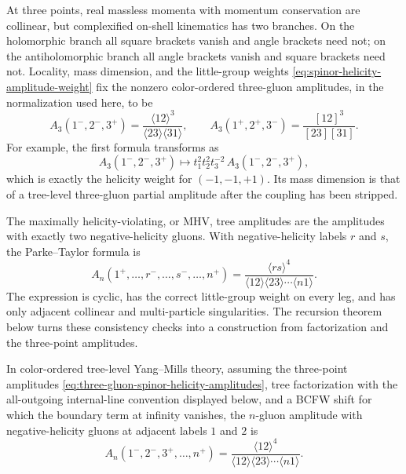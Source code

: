 At three points, real massless momenta with momentum conservation are
collinear, but complexified on-shell kinematics has two branches.  On the
holomorphic branch all square brackets vanish and angle brackets need not; on
the antiholomorphic branch all angle brackets vanish and square brackets need
not.  Locality, mass dimension, and the little-group weights
\eqref{eq:spinor-helicity-amplitude-weight} fix the nonzero color-ordered
three-gluon amplitudes, in the normalization used here, to be
\begin{equation}
  A_3(1^-,2^-,3^+)
  =
  \frac{\langle12\rangle^3}
       {\langle23\rangle\langle31\rangle},
  \qquad
  A_3(1^+,2^+,3^-)
  =
  \frac{[12]^3}{[23][31]}.
  \label{eq:three-gluon-spinor-helicity-amplitudes}
\end{equation}
For example, the first formula transforms as
\[
  A_3(1^-,2^-,3^+)
  \longmapsto
  t_1^2t_2^2t_3^{-2}\,
  A_3(1^-,2^-,3^+),
\]
which is exactly the helicity weight for \((-1,-1,+1)\).  Its mass dimension is
that of a tree-level three-gluon partial amplitude after the coupling has been
stripped.

The maximally helicity-violating, or MHV, tree amplitudes are the amplitudes
with exactly two negative-helicity gluons.  With negative-helicity labels
\(r\) and \(s\), the Parke--Taylor formula is
\begin{equation}
  A_n(1^+,\ldots,r^-,\ldots,s^-,\ldots,n^+)
  =
  \frac{\langle rs\rangle^4}
  {\langle12\rangle\langle23\rangle\cdots
   \langle n1\rangle}.
  \label{eq:parke-taylor-mhv}
\end{equation}
The expression is cyclic, has the correct little-group weight on every leg,
and has only adjacent collinear and multi-particle singularities.  The
recursion theorem below turns these consistency checks into a construction
from factorization and the three-point amplitudes.

\begin{theorem}
\label{thm:parke-taylor-mhv-tree}
  In color-ordered tree-level Yang--Mills theory, assuming the three-point
  amplitudes \eqref{eq:three-gluon-spinor-helicity-amplitudes}, tree
  factorization with the all-outgoing internal-line convention displayed
  below, and a BCFW shift for which the boundary term at infinity vanishes, the
  \(n\)-gluon amplitude with negative-helicity gluons at adjacent labels
  \(1\) and \(2\) is
  \[
    A_n(1^-,2^-,3^+,\ldots,n^+)
    =
    \frac{\langle12\rangle^4}
    {\langle12\rangle\langle23\rangle\cdots\langle n1\rangle}.
  \]
\end{theorem}

